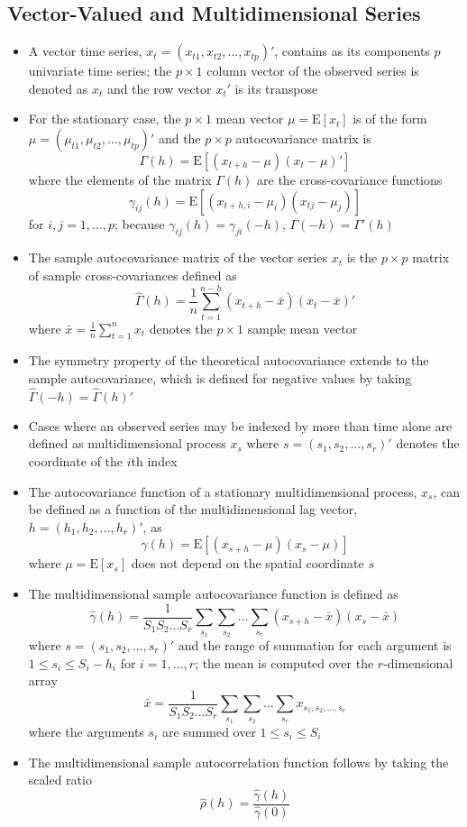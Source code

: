 \documentclass[12pt]{article}
\newcommand{\expe}[1]{\text{E}\left[ #1 \right]}
\begin{document}
\subsection{Vector-Valued and Multidimensional Series}
\begin{itemize}
\item A vector time series, $x_t = (x_{t1}, x_{t2},\dots,x_{tp})'$, contains as its components $p$ univariate time series; the $p\times 1$ column vector of the observed series is denoted as $x_t$ and the row vector $x_t'$ is its transpose 
\item For the stationary case, the $p \times 1$ mean vector $\mu = \expe{x_t}$ is of the form $\mu = (\mu_{t1},\mu_{t2},\dots,\mu_{tp})'$ and the $p\times p$ autocovariance matrix is $$ \Gamma(h) = \expe{(x_{t+h} - \mu)(x_t - \mu)'} $$ where the elements of the matrix $\Gamma(h)$ are the cross-covariance functions $$ \gamma_{ij}(h) = \expe{(x_{t+h,i} - \mu_i)(x_{tj} - \mu_j)} $$ for $i,j = 1,\dots,p$; because $\gamma_{ij}(h) = \gamma_{ji}(-h)$, $\Gamma(-h) = \Gamma'(h)$
\item The sample autocovariance matrix of the vector series $x_t$ is the $p \times p$ matrix of sample cross-covariances defined as $$ \hat{\Gamma}(h) = \frac{1}{n} \sum_{t=1}^{n-h} (x_{t+h}- \bar{x})(x_t - \bar{x})' $$ where $ \bar{x} = \frac{1}{n} \sum_{t=1}^n x_t$ denotes the $p \times 1$ sample mean vector 
\item The symmetry property of the theoretical autocovariance extends to the sample autocovariance, which is defined for negative values by taking $\hat{\Gamma}(-h) = \hat{\Gamma}(h)'$
\item Cases where an observed series may be indexed by more than time alone are defined as multidimensional process $x_s$ where $s = (s_1,s_2,\dots,s_r)'$ denotes the coordinate of the $i$th index 
\item The autocovariance function of a stationary multidimensional process, $x_s$, can be defined as a function of the multidimensional lag vector, $h = (h_1,h_2,\dots,h_r)'$, as $$ \gamma(h) = \expe{(x_{s+h} - \mu)(x_s - \mu)} $$ where $\mu = \expe{x_s}$ does not depend on the spatial coordinate $s$ 
\item The multidimensional sample autocovariance function is defined as $$ \hat{\gamma}(h) = \frac{1}{S_1S_2\dots S_r}\sum_{s_1}\sum_{s_2} \dots \sum_{s_r} (x_{s+h} - \bar{x})(x_s - \bar{x}) $$ where $s = (s_1,s_2,\dots,s_r)'$ and the range of summation for each argument is $ 1 \leq s_i \leq S_i - h_i$ for $i=1,\dots,r$; the mean is computed over the $r$-dimensional array $$ \bar{x} = \frac{1}{S_1S_2\dots S_r} \sum_{s_1}\sum_{s_2}\dots\sum_{s_r} x_{s_1,s_2,\dots,s_r} $$ where the arguments $s_i$ are summed over $1 \leq s_i \leq S_i$
\item The multidimensional sample autocorrelation function follows by taking the scaled ratio $$ \hat{\rho}(h) = \frac{\hat{\gamma}(h)}{\hat{\gamma}(0)} $$ 
\end{itemize} \newpage
\end{document}
